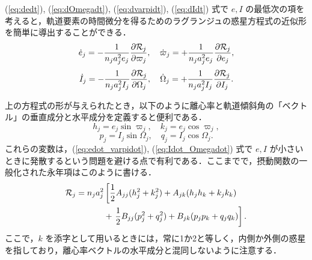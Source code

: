 \documentclass[11pt,a4paper,oneside,onecolumn]{jreport}
\begin{document}
(\ref{eq:dedt}), (\ref{eq:dOmegadt}), (\ref{eq:dvarpidt}), (\ref{eq:dIdt}) 式で $e, I$ の最低次の項を考えると，軌道要素の時間微分を得るためのラグランジュの惑星方程式の近似形を簡単に導出することができる．
\begin{equation}
\dot{e}_j = - \frac{1}{n_j a_j^2 e_j} \frac{\partial {\cal R}_j}{\partial \varpi_j}, \quad \dot{\varpi}_j = + \frac{1}{n_j a_j^2 e_j} \frac{\partial {\cal R}_j}{\partial e_j}, \label{eq:edot_varpidot}
\end{equation}
\begin{equation}
\dot{I}_j = - \frac{1}{n_j a_j^2 I_j} \frac{\partial {\cal R}_j}{\partial \Omega_j}, \quad \dot{\Omega}_j = + \frac{1}{n_j a_j^2 I_j} \frac{\partial {\cal R}_j}{\partial I_j}. \label{eq:Idot_Omegadot}
\end{equation}

上の方程式の形が与えられたとき，以下のように離心率と軌道傾斜角の「ベクトル」の垂直成分と水平成分を定義すると便利である．
\begin{equation}
h_j = e_j \sin \varpi_j, \quad k_j = e_j \cos \varpi_j,
\end{equation}
\begin{equation}
p_j = I_j \sin \Omega_j, \quad q_j = I_j \cos \Omega_j.
\end{equation}
これらの変数は，(\ref{eq:edot_varpidot}), (\ref{eq:Idot_Omegadot}) 式で $e, I$ が小さいときに発散するという問題を避ける点で有利である．ここまでで，摂動関数の一般化された永年項はこのように書ける．
\begin{equation}
\begin{split}
{\cal R}_j = n_j a_j^2 & \left[ \frac{1}{2} A_{jj} (h_j^2 + k_j^2) + A_{jk} (h_j h_k + k_j k_k) \right. \\
& + \left. \frac{1}{2} B_{jj} (p_j^2 + q_j^2) + B_{jk} (p_j p_k + q_j q_k) \right]. \\
\end{split} \label{eq:cal_R_hkpq}
\end{equation} 
ここで，$k$ を添字として用いるときには，常に1か2と等しく，内側か外側の惑星を指しており，離心率ベクトルの水平成分と混同しないように注意する．
\end{document}

